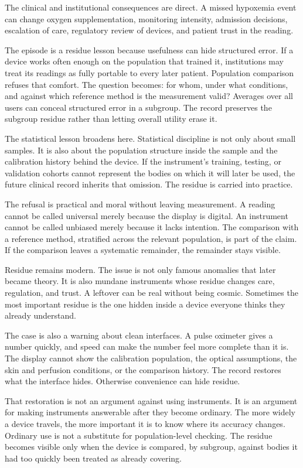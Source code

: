 The clinical and institutional consequences are direct. A missed hypoxemia event can change
oxygen supplementation, monitoring intensity, admission decisions,
escalation of care, regulatory review of devices, and patient trust in the
reading.

The episode is a residue lesson because usefulness can hide structured
error. If a device works often enough on the population that trained it,
institutions may treat its readings as fully portable to every later
patient. Population comparison refuses that comfort. The question becomes:
for whom, under what conditions, and against which reference method is the
measurement valid? Averages over all users can conceal structured error in a
subgroup. The record preserves the subgroup residue rather than letting overall
utility erase it.

The statistical lesson broadens here. Statistical discipline is not only
about small samples. It is also about the population structure inside the
sample and the calibration history behind the device. If the instrument's
training, testing, or validation cohorts cannot represent the bodies on
which it will later be used, the future clinical record inherits that
omission. The residue is carried into practice.

The refusal is practical and moral without leaving measurement. A reading
cannot be called universal merely because the display is digital. An
instrument cannot be called unbiased merely because it lacks intention. The
comparison with a reference method, stratified across the relevant
population, is part of the claim. If the comparison leaves a systematic
remainder, the remainder stays visible.

Residue remains modern. The issue is not only famous anomalies that later
became theory. It is also mundane instruments whose residue changes care,
regulation, and trust. A leftover can be real without being cosmic.
Sometimes the most important residue is the one hidden inside a device
everyone thinks they already understand.

The case is also a warning about clean interfaces. A pulse oximeter gives a
number quickly, and speed can make the number feel more complete than it
is. The display cannot show the calibration population, the optical
assumptions, the skin and perfusion conditions, or the comparison history.
The record restores what the interface hides. Otherwise convenience
can hide residue.

That restoration is not an argument against using instruments. It is an
argument for making instruments answerable after they become ordinary. The
more widely a device travels, the more important it is to know where its
accuracy changes. Ordinary use is not a substitute for population-level
checking. The residue becomes visible only when the device is compared, by
subgroup, against bodies it had too quickly been treated as already
covering.

